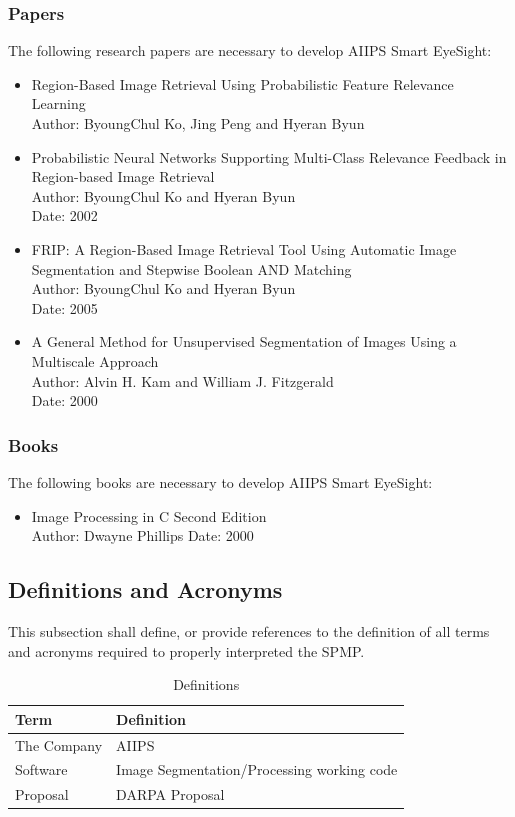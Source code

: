 \documentclass[12pt]{article}
\begin{document}
\subsubsection{Papers}
The following research papers are necessary to develop AIIPS Smart EyeSight:
\begin{itemize}
  \item Region-Based Image Retrieval Using Probabilistic Feature Relevance Learning\\
        Author: ByoungChul Ko, Jing Peng and Hyeran Byun
  \item Probabilistic Neural Networks Supporting Multi-Class Relevance Feedback in Region-based Image Retrieval\\
        Author: ByoungChul Ko and Hyeran Byun\\
        Date: 2002
  \item FRIP: A Region-Based Image Retrieval Tool Using Automatic Image Segmentation and Stepwise Boolean AND Matching\\
        Author: ByoungChul Ko and Hyeran Byun\\
        Date: 2005
  \item A General Method for Unsupervised Segmentation of Images Using a Multiscale Approach\\
        Author: Alvin H. Kam and William J. Fitzgerald\\
        Date: 2000
\end{itemize}

\subsubsection{Books}
The following books are necessary to develop AIIPS Smart EyeSight:
\begin{itemize}
  \item Image Processing in C Second Edition\\
        Author: Dwayne Phillips
        Date: 2000
\end{itemize}

\subsection{Definitions and Acronyms}
This subsection shall define, or provide references to the definition of all terms and acronyms required to properly interpreted the SPMP.
\begin{table}[H]\centering
\begin{tabular}{|>{\centering\arraybackslash}m{7cm}|>{\centering\arraybackslash}m{7cm}|}
  \hline
  Term & Definition \\
   \hline
   The Company & AIIPS \\
   \hline
   Software & Image Segmentation/Processing working code\\
   \hline
   Proposal & DARPA Proposal\\
   \hline
\end{tabular}
\caption{Definitions}
\end{table}
\end{document}
